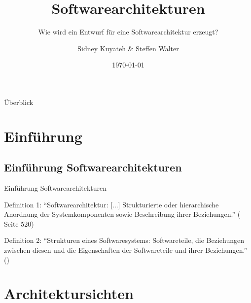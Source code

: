 \documentclass{beamer}
\title{Softwarearchitekturen}
\subtitle{Wie wird ein Entwurf für eine Softwarearchitektur erzeugt?}
\author{Sidney Kuyateh \& Steffen Walter}
\institute{Duale Hochschule Baden-Württemberg}
\date{\today}
\begin{document}
	\maketitle
	\begin{frame}{Überblick}
		\scriptsize
		\setlength{\baselineskip}{7pt}
		\tableofcontents[sectionstyle=show]
	\end{frame}
		\section{Einführung}
		\subsection{Einführung Softwarearchitekturen}
		\begin{frame}{Einführung Softwarearchitekturen}
			\begin{block}{Definition 1:}
				\enquote{Softwarearchitektur: [...] Strukturierte oder hierarchische Anordnung der Systemkomponenten sowie Beschreibung ihrer Beziehungen.} (\cite{balzert} Seite 520)
			\end{block}
			\begin{block}{Definition 2:}
				\enquote{Strukturen eines Softwaresystems: Softwareteile, die Beziehungen zwischen diesen und die Eigenschaften der Softwareteile und ihrer Beziehungen.} (\cite{clements})
			\end{block}
		\end{frame}
		\section{Architektursichten}
\end{document}
